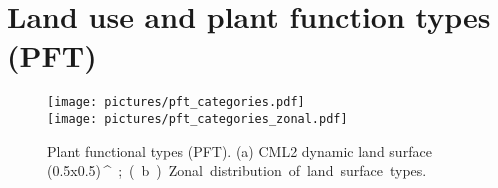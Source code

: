 \documentclass[gmd, manuscript]{copernicus}
\begin{document}






\appendix
\section{Land use and plant function types (PFT)}    %
\appendixfigures
\begin{figure*}[!htbp]
  \centering
  \texttt{[image: pictures/pft\_categories.pdf]}\\
  \texttt{[image: pictures/pft\_categories\_zonal.pdf]}
  \caption{Plant functional types (PFT). (a) CML2 dynamic land surface (0.5x0.5)\,\unit{^\circ}; (b) Zonal distribution of land surface types.}
  \label{fig:pft_landsurface}
\end{figure*}








\end{document}
